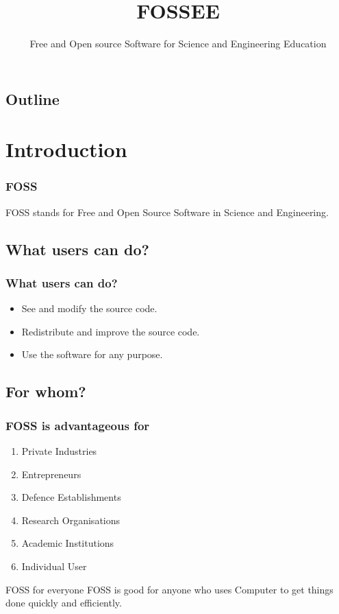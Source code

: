 \documentclass[compress,red]{beamer} %
\title{FOSSEE}
\subtitle{Free and Open source Software for Science and Engineering
Education}
\author[]{}  %
\institute{IIT Bombay}
\date[]{} %
\begin{document}
\begin{frame}
	 \titlepage
\end{frame}

\begin{frame}
\section*{Outline}
\tableofcontents
\end{frame}


\section{Introduction}
\begin{frame}
\frametitle{FOSS}
\begin{definition}
\alert{FOSS} stands for Free and Open Source Software in Science and Engineering.
\end{definition}
\end{frame}

\subsection{What users can do?}
\begin{frame}
\frametitle{What users can do?}
\begin{block}
\begin{itemize}
\item See and modify the source code.\pause
\item Redistribute and improve the source code.\pause
\item Use the software for any purpose.\pause
\end{itemize}
\end{block}
\end{frame}

\subsection{For whom?}
\begin{frame}
\frametitle{FOSS is advantageous for}
\begin{enumerate}
\item Private Industries \pause
\item Entrepreneurs \pause
\item Defence Establishments \pause
\item Research Organisations \pause
\item Academic Institutions\pause
\item Individual User \pause
\end{enumerate}
\begin{block}{FOSS for everyone}
FOSS is good for anyone who uses Computer to get things done quickly and efficiently. 
\end{block}
\end{frame}
\end{document}
